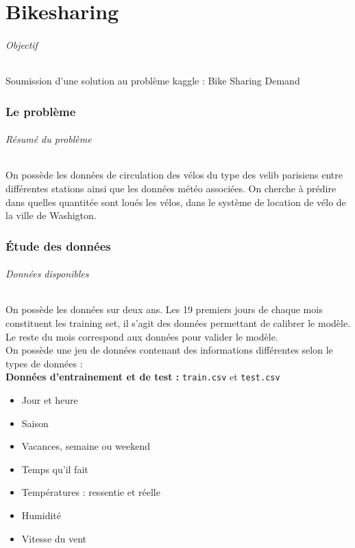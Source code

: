 \part{Bikesharing}

\paragraph{Objectif}
Soumission d'une solution au problème kaggle : Bike Sharing Demand
\\

\section{Le problème}

\paragraph{Résumé du problème}
On possède les données de circulation des vélos du type des velib parisiens entre différentes stations ainsi que les données météo associées. On cherche à prédire dans quelles quantitée sont loués les vélos, dans le système de location de vélo de la ville de Washigton.
\\

\section{Étude des données}

\paragraph{Données disponibles} On possède les données sur deux ans. Les 19 premiers jours de chaque mois constituent les training set, il s'agit des données permettant de calibrer le modèle. Le reste du mois correspond aux données pour valider le modèle.
\\

On possède une jeu de données contenant des informations différentes selon le types de données :\\

\textbf{Données d'entrainement et de test : } \verb|train.csv| et \verb|test.csv|

\begin{itemize}[label=$\circ$]
\item Jour et heure
\item Saison
\item Vacances, semaine ou weekend
\item Temps qu'il fait
\item Températures : ressentie et réelle
\item Humidité
\item Vitesse du vent
\end{itemize}

